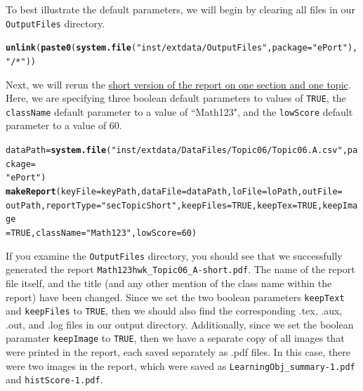 \documentclass{article}\usepackage[]{graphicx}\usepackage[]{color}
\makeatletter
\newcommand{\hlnum}[1]{\textcolor[rgb]{0.686,0.059,0.569}{#1}}%
\newcommand{\hlstr}[1]{\textcolor[rgb]{0.192,0.494,0.8}{#1}}%
\newcommand{\hlstd}[1]{\textcolor[rgb]{0.345,0.345,0.345}{#1}}%
\newcommand{\hlkwb}[1]{\textcolor[rgb]{0.69,0.353,0.396}{#1}}%
\newcommand{\hlkwc}[1]{\textcolor[rgb]{0.333,0.667,0.333}{#1}}%
\newcommand{\hlkwd}[1]{\textcolor[rgb]{0.737,0.353,0.396}{\textbf{#1}}}%
\newenvironment{kframe}{%
 \def\at@end@of@kframe{}%
 \ifinner\ifhmode%
  \def\at@end@of@kframe{\end{minipage}}%
  \begin{minipage}{\columnwidth}%
 \fi\fi%
 \def\FrameCommand##1{\hskip\@totalleftmargin \hskip-\fboxsep
 \colorbox{shadecolor}{##1}\hskip-\fboxsep
     \hskip-\linewidth \hskip-\@totalleftmargin \hskip\columnwidth}%
 \MakeFramed {\advance\hsize-\width
   \@totalleftmargin\z@ \linewidth\hsize
   \@setminipage}}%
 {\par\unskip\endMakeFramed%
 \at@end@of@kframe}
\newenvironment{knitrout}{}{} %
\numberwithin{equation}{section} %
\makeatother
\begin{document}
To best illustrate the default parameters, we will begin by clearing all files in our \texttt{OutputFiles} directory. \\

\begin{knitrout}
\color{fgcolor}\begin{kframe}
\begin{alltt}
\hlkwd{unlink}\hlstd{(}\hlkwd{paste0}\hlstd{(}\hlkwd{system.file}\hlstd{(}\hlstr{"inst/extdata/OutputFiles"}\hlstd{,} \hlkwc{package} \hlstd{=} \hlstr{"ePort"}\hlstd{),} \hlstr{"/*"}\hlstd{))}
\end{alltt}
\end{kframe}
\end{knitrout}

Next, we will rerun the \hyperref[sec:oneTopicSectionShort]{short version of the report on one section and one topic}. Here, we are specifying three boolean default parameters to values of \texttt{TRUE}, the \texttt{className} default parameter to a value of ``Math123", and the \texttt{lowScore} default parameter to a value of 60. \\

\begin{knitrout}
\color{fgcolor}\begin{kframe}
\begin{alltt}
\hlstd{dataPath} \hlkwb{=} \hlkwd{system.file}\hlstd{(}\hlstr{"inst/extdata/DataFiles/Topic06/Topic06.A.csv"}\hlstd{,} \hlkwc{package} \hlstd{=}
  \hlstr{"ePort"}\hlstd{)}
\hlkwd{makeReport}\hlstd{(}\hlkwc{keyFile} \hlstd{= keyPath,} \hlkwc{dataFile} \hlstd{= dataPath,} \hlkwc{loFile} \hlstd{= loPath,} \hlkwc{outFile} \hlstd{=}
  \hlstd{outPath,} \hlkwc{reportType} \hlstd{=} \hlstr{"secTopicShort"}\hlstd{,} \hlkwc{keepFiles} \hlstd{=} \hlnum{TRUE}\hlstd{,} \hlkwc{keepTex} \hlstd{=} \hlnum{TRUE}\hlstd{,} \hlkwc{keepImage}
  \hlstd{=} \hlnum{TRUE}\hlstd{,} \hlkwc{className} \hlstd{=} \hlstr{"Math123"}\hlstd{,} \hlkwc{lowScore} \hlstd{=} \hlnum{60}\hlstd{)}
\end{alltt}
\end{kframe}
\end{knitrout}

If you examine the \texttt{OutputFiles} directory, you should see that we successfully generated the report \texttt{Math123hwk\_Topic06\_A-short.pdf}. The name of the report file itself, and the title (and any other mention of the class name within the report) have been changed. Since we set the two boolean parameters \texttt{keepText} and \texttt{keepFiles} to \texttt{TRUE}, then we should also find the corresponding .tex, .aux, .out, and .log files in our output directory. Additionally, since we set the boolean paramater \texttt{keepImage} to \texttt{TRUE}, then we have a separate copy of all images that were printed in the report, each saved separately as .pdf files. In this case, there were two images in the report, which were saved as \texttt{LearningObj\_summary-1.pdf} and \texttt{histScore-1.pdf}.
\end{document}
